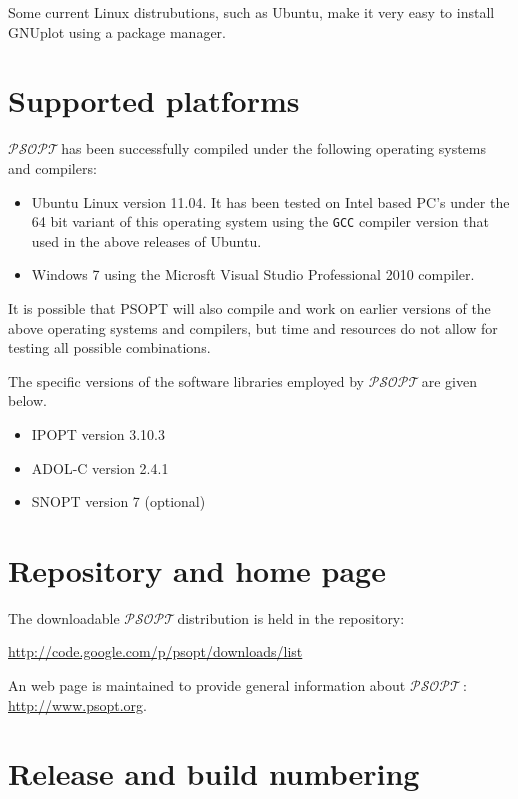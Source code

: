 \documentclass[a4paper,11pt]{report}    %
\newcommand{\psopt}{$\mathcal{PSOPT}$\,}  %
\begin{document}
Some current Linux distrubutions, such as Ubuntu, make it very easy to install GNUplot using a package manager.


\section{Supported platforms}

\psopt has been successfully compiled under the following operating systems and compilers:

\begin{itemize}
 \item  Ubuntu Linux version   11.04. It has been tested on Intel based PC's
under the  64 bit variant of this operating system using the \texttt{GCC} compiler version
that used in the above releases of Ubuntu. 
\item  Windows 7  using the  Microsft Visual Studio Professional  2010 compiler.
\end{itemize}

It is possible that PSOPT will also compile and work on earlier versions of the above operating systems
and compilers, but time and resources do not allow for testing all possible combinations.

The specific versions of the software libraries employed by \psopt are given below.

\begin{itemize}
 \item IPOPT version 3.10.3
 \item ADOL-C version 2.4.1
 \item SNOPT version 7 (optional)
\end{itemize}

\section{Repository and home page}

The downloadable \psopt distribution is held in the repository:

\href{http://code.google.com/p/psopt/downloads/list}{http://code.google.com/p/psopt/downloads/list}

An web page is maintained to provide general information about \psopt: \href{http://www.psopt.org}{http://www.psopt.org}.


\section{Release and build numbering}
\end{document}

